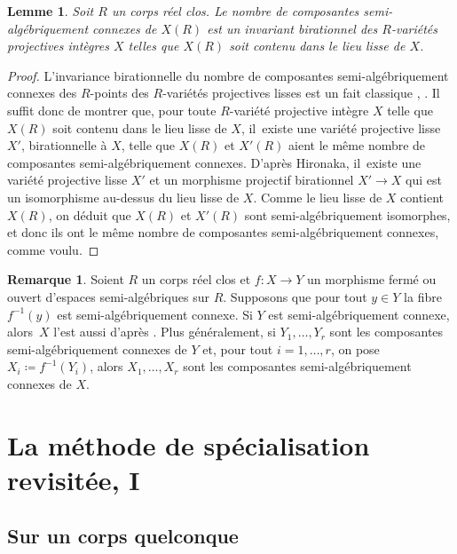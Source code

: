 \documentclass[JEP,XML,SOM,Unicode,francais,published]{cedram}
\newtheorem{lemma}[thm]{Lemme}
\theoremstyle{definition}
\newtheorem{rmk}[thm]{Remarque}
\begin{document}
\begin{lemma}\label{connexe-invariant}
Soit $R$ un corps réel clos. Le nombre de composantes semi-algébri\-quement connexes de $X(R)$ est un invariant birationnel des $R$-variétés projectives intègres $X$ telles que $X(R)$ soit contenu dans le lieu lisse de $X$.
\end{lemma}

\begin{proof}
L'invariance birationnelle du nombre de composantes semi-algé\-briquement connexes des $R$-points des $R$-variétés projectives lisses est un fait classique \cite[\S 13]{delfs1981semialgebraicII}, \cite[Th.\,3.4.12]{bochnak1998real}. Il suffit donc de montrer que, pour toute $R$-variété projective intègre $X$ telle que $X(R)$ soit contenu dans le lieu lisse de $X$, il~existe une variété projective lisse $X'$, birationnelle à $X$, telle que $X(R)$ et $X'(R)$ aient le même nombre de composantes semi-algébriquement connexes. D'après Hironaka, il~existe une variété projective lisse $X'$ et un morphisme projectif birationnel $X'\to X$ qui est un isomorphisme au-dessus du lieu lisse de $X$. Comme le lieu lisse de $X$ contient $X(R)$, on déduit que $X(R)$ et $X'(R)$ sont semi-algébriquement isomorphes, et donc ils ont le même nombre de composantes semi-algébriquement connexes, comme voulu.
\end{proof}

\begin{rmk}\label{fibres-connexes}
Soient $R$ un corps réel clos et $f\colon X\to Y$ un morphisme fermé ou ouvert d'espaces semi-algébriques sur $R$. Supposons que pour tout $y\in Y$ la fibre $f^{-1}(y)$ est semi-algébriquement connexe. Si $Y$ est semi-algébriquement connexe, alors~$X$ l'est aussi d'après \cite[Exer.\,4.4.1(a)]{scheiderer2024course}. Plus généralement, si $Y_1,\dots,Y_r$ sont les composantes semi-algébriquement connexes de $Y$ et, pour tout $i=1,\dots,r$, on pose $X_i\coloneqq f^{-1}(Y_i)$, alors $X_1,\dots,X_r$ sont les composantes semi-algébriquement connexes de $X$.
\end{rmk}

\section{La méthode de spécialisation revisitée, I}
\label{parasp}

\subsection{Sur un corps quelconque}
\end{document}
